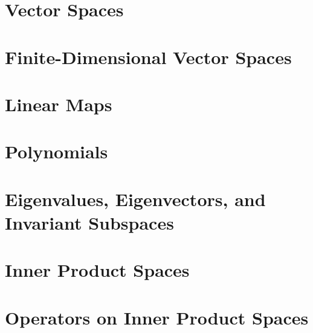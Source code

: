 \documentclass[lang=en,11pt,color=blue]{elegantbook}
\begin{document}
\frontmatter

\tableofcontents

\mainmatter
\chapter{Vector Spaces}  
\chapter{Finite-Dimensional Vector Spaces}  
\chapter{Linear Maps} 
\chapter{Polynomials} 
\chapter{Eigenvalues, Eigenvectors, and Invariant Subspaces} 
\chapter{Inner Product Spaces} 
\chapter{Operators on Inner Product Spaces} 
\end{document}
